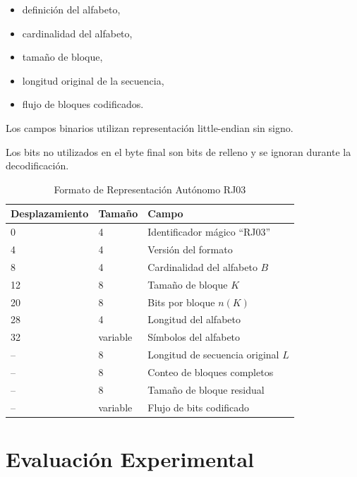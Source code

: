 \documentclass[onecolumn]{IEEEtran}
\begin{document}
\begin{itemize}

\item definición del alfabeto,

\item cardinalidad del alfabeto,

\item tamaño de bloque,

\item longitud original de la secuencia,

\item flujo de bloques codificados.

\end{itemize}

Los campos binarios utilizan representación little-endian sin signo.

Los bits no utilizados en el byte final son bits de relleno y se
ignoran durante la decodificación.

\begin{table}[!t]
\caption{Formato de Representación Autónomo RJ03}
\label{tab:rj03}
\centering
\begin{tabular}{lll}
\toprule
Desplazamiento & Tamaño & Campo\\
\midrule
0 & 4 & Identificador mágico ``RJ03''\\
4 & 4 & Versión del formato\\
8 & 4 & Cardinalidad del alfabeto $B$\\
12 & 8 & Tamaño de bloque $K$\\
20 & 8 & Bits por bloque $n(K)$\\
28 & 4 & Longitud del alfabeto\\
32 & variable & Símbolos del alfabeto\\
-- & 8 & Longitud de secuencia original $L$\\
-- & 8 & Conteo de bloques completos\\
-- & 8 & Tamaño de bloque residual\\
-- & variable & Flujo de bits codificado\\
\bottomrule
\end{tabular}
\end{table}


\section{Evaluación Experimental}
\end{document}
